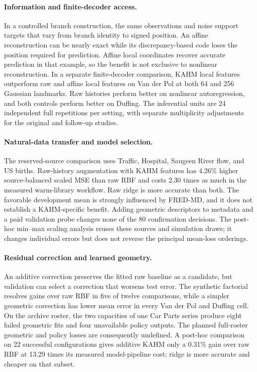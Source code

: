 \paragraph{Information and finite-decoder access.}
In a controlled branch construction, the same observations and noise
support targets that vary from branch identity to signed position.
An affine reconstruction can be nearly exact while its discrepancy-based
code loses the position required for prediction. Affine local coordinates
recover accurate prediction in that example, so the benefit is not
exclusive to nonlinear reconstruction. In a separate finite-decoder
comparison, KAHM local features outperform raw and affine local features
on Van der Pol at both 64 and 256 Gaussian landmarks. Raw histories
perform better on nonlinear autoregression, and both controls perform
better on Duffing. The inferential units are 24 independent full
repetitions per setting, with separate multiplicity adjustments for the
original and follow-up studies.

\paragraph{Natural-data transfer and model selection.}
The reserved-source comparison uses Traffic, Hospital, Saugeen River
flow, and US births. Raw-history augmentation with KAHM features has
4.26\% higher source-balanced scaled MSE than raw RBF and costs 2.30
times as much in the measured warm-library workflow. Raw ridge is more
accurate than both. The favorable development mean is strongly
influenced by FRED-MD, and it does not establish a KAHM-specific benefit.
Adding geometric descriptors to metadata and a paid validation probe
changes none of the 80 confirmation decisions. The post-hoc min--max
scaling analysis reuses these sources and simulation draws; it changes
individual errors but does not reverse the principal mean-loss orderings.

\paragraph{Residual correction and learned geometry.}
An additive correction preserves the fitted raw baseline as a candidate,
but validation can select a correction that worsens test error. The
synthetic factorial resolves gains over raw RBF in five of twelve
comparisons, while a simpler geometric correction has lower mean error
in every Van der Pol and Duffing cell. On the archive roster, the two
capacities of one Car Parts series produce eight failed geometric fits
and four unavailable policy outputs. The planned full-roster geometric
and policy losses are consequently undefined. A post-hoc comparison on
22 successful configurations gives additive KAHM only a 0.31\% gain
over raw RBF at 13.29 times its measured model-pipeline cost; ridge is
more accurate and cheaper on that subset.

